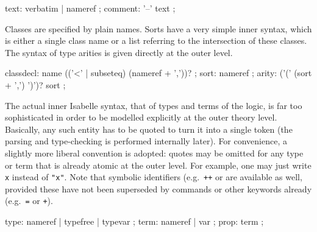 \begin{isabellebody}
\begin{isamarkuptext}
  \begin{rail}
    text: verbatim | nameref
    ;
    comment: '--' text
    ;
  \end{rail}%
\end{isamarkuptext}%
\isamarkuptrue%
%
\isamarkuptrue%
%
\begin{isamarkuptext}%
Classes are specified by plain names.  Sorts have a very simple
  inner syntax, which is either a single class name  or a
  list  referring to the
  intersection of these classes.  The syntax of type arities is given
  directly at the outer level.


  \begin{rail}
    classdecl: name (('<' | subseteq) (nameref + ','))?
    ;
    sort: nameref
    ;
    arity: ('(' (sort + ',') ')')? sort
    ;
  \end{rail}%
\end{isamarkuptext}%
\isamarkuptrue%
%
\isamarkuptrue%
%
\begin{isamarkuptext}%
The actual inner Isabelle syntax, that of types and terms of the
  logic, is far too sophisticated in order to be modelled explicitly
  at the outer theory level.  Basically, any such entity has to be
  quoted to turn it into a single token (the parsing and type-checking
  is performed internally later).  For convenience, a slightly more
  liberal convention is adopted: quotes may be omitted for any type or
  term that is already atomic at the outer level.  For example, one
  may just write \texttt{x} instead of \texttt{"x"}.  Note that
  symbolic identifiers (e.g.\ \texttt{++} or \isa{{\isasymforall}} are available
  as well, provided these have not been superseded by commands or
  other keywords already (e.g.\ \texttt{=} or \texttt{+}).

  \begin{rail}
    type: nameref | typefree | typevar
    ;
    term: nameref | var
    ;
    prop: term
    ;
  \end{rail}


\end{isamarkuptext}
\end{isabellebody}
